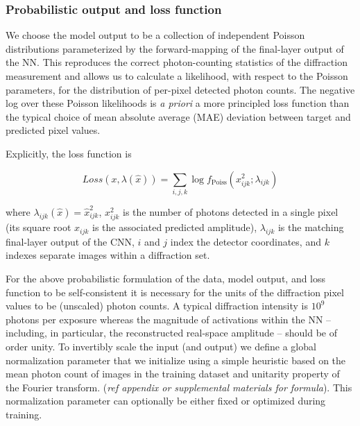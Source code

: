 \documentclass[sn-mathphys]{sn-jnl}%
\theoremstyle{thmstyleone}%
\theoremstyle{thmstyletwo}%
\theoremstyle{thmstylethree}%
\begin{document}
\subsubsection{Probabilistic output and loss function}

%

We choose the model output to be a collection of independent Poisson distributions parameterized by the forward-mapping of the final-layer output of the NN. This reproduces the correct photon-counting statistics of the diffraction measurement and allows us to calculate a likelihood, with respect to the Poisson parameters, for the distribution of per-pixel detected photon counts. The negative log over these Poisson likelihoods is \emph{a priori} a more principled loss function than the typical choice of mean absolute average (MAE) deviation between target and predicted pixel values.

Explicitly, the loss function is

$$
Loss(x, \lambda(\hat{x})) = \sum_{i,j,k}\log f_{\text{Poiss}}(x_{ijk}^2;\lambda_{ijk})
$$


where $\lambda_{ijk}(\hat{x}) = \hat{x}_{ijk}^2$, $x_{ijk}^2$ is the number of photons detected in a single pixel (its square root $x_{ijk}$ is the associated predicted amplitude), $\lambda_{ijk}$ is the matching final-layer output of the CNN, $i$ and $j$ index the detector coordinates, and $k$ indexes separate images within a diffraction set. 

For the above probabilistic formulation of the data, model output, and loss function to be self-consistent it is necessary for the units of the diffraction pixel values to be (unscaled) photon counts. A typical diffraction intensity is $10^9$ photons per exposure whereas the magnitude of activations within the NN -- including, in particular, the reconstructed real-space amplitude -- should be of order unity. To invertibly scale the input (and output) we define a global normalization parameter that we initialize using a simple heuristic based on the mean photon count of images in the training dataset and unitarity property of the Fourier transform. (\emph{ref appendix or supplemental materials for formula}). This normalization parameter can optionally be either fixed or optimized during training. 
\end{document}
